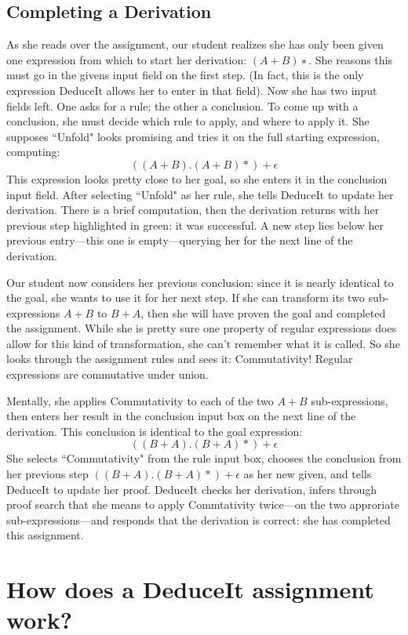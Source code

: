\documentclass{sigchi}
\begin{document}
\subsection{Completing a Derivation}
As she reads over the assignment, our student realizes she has only been given one expression from which to start her derivation: $(A+B)∗$. She reasons this must go in the givens input field on the first step. (In fact, this is the only expression DeduceIt allows her to enter in that field). Now she has two input fields left. One asks for a rule; the other a conclusion. To come up with a conclusion, she must decide which rule to apply, and where to apply it. She supposes ``Unfold" looks promising and tries it on the full starting expression, computing:
$$((A + B).(A + B)*)+\epsilon$$
This expression looks pretty close to her goal, so she enters it in the conclusion input field. After selecting ``Unfold" as her rule, she tells DeduceIt to update her derivation. There is a brief computation, then the derivation returns with her previous step highlighted in green: it was successful. A new step lies below her previous entry---this one is empty---querying her for the next line of the derivation.

Our student now considers her previous conclusion: since it is nearly identical to the goal, she wants to use it for her next step. If she can transform its two sub-expressions $A+B$ to $B+A$, then she will have proven the goal and completed the assignment. While she is pretty sure one property of regular expressions does allow for this kind of transformation, she can't remember what it is called. So she looks through the assignment rules and sees it: Commutativity! Regular expressions are commutative under union.

Mentally, she applies Commutativity to each of the two $A+B$ sub-expressions, then enters her result in the conclusion input box on the next line of the derivation. This conclusion is identical to the goal expression: 
$$((B+A).(B+A)*)+\epsilon$$
She selects ``Commutativity" from the rule input box, chooses the conclusion from her previous step $((B+A).(B+A)*)+\epsilon$ as her new given, and tells DeduceIt to  update her proof. DeduceIt checks her derivation, infers through proof search that she means to apply Commtativity twice---on the two approriate sub-expressions---and responds that the derivation is correct: she has completed this assignment.


\section{How does a DeduceIt assignment work?}
\end{document}
